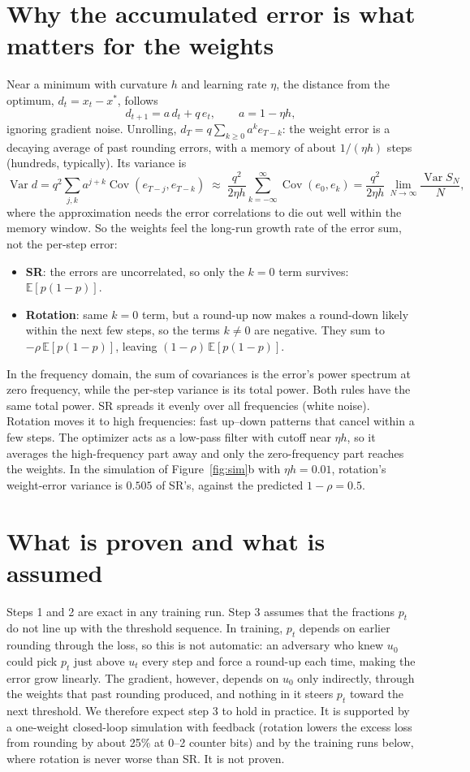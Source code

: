 \documentclass[11pt,letterpaper]{article}
\theoremstyle{definition}
\newcommand{\E}{\mathbb{E}}
\newcommand{\Var}{\operatorname{Var}}
\newcommand{\Cov}{\operatorname{Cov}}
\newcommand{\1}{\mathbf{1}}
\begin{document}
\section{Why the accumulated error is what matters for the weights}
Near a minimum with curvature $h$ and learning rate $\eta$, the distance from the optimum, $d_t=x_t-x^*$, follows
\[
d_{t+1}=a\,d_t+q\,e_t,\qquad a=1-\eta h,
\]
ignoring gradient noise. Unrolling, $d_T=q\sum_{k\ge0}a^k e_{T-k}$: the weight error is a decaying average of past
rounding errors, with a memory of about $1/(\eta h)$ steps (hundreds, typically). Its variance is
\[
\Var d=q^2\sum_{j,k}a^{j+k}\Cov(e_{T-j},e_{T-k})\;\approx\;\frac{q^2}{2\eta h}\sum_{k=-\infty}^{\infty}\Cov(e_0,e_k)
=\frac{q^2}{2\eta h}\,\lim_{N\to\infty}\frac{\Var S_N}{N},
\]
where the approximation needs the error correlations to die out well within the memory window. So the weights feel
the long-run growth rate of the error sum, not the per-step error:
\begin{itemize}\setlength{\itemsep}{0pt}
\item \textbf{SR}: the errors are uncorrelated, so only the $k=0$ term survives: $\E[p(1-p)]$.
\item \textbf{Rotation}: same $k=0$ term, but a round-up now makes a round-down likely within the next few steps, so
the terms $k\ne0$ are negative. They sum to $-\rho\,\E[p(1-p)]$, leaving $(1-\rho)\,\E[p(1-p)]$.
\end{itemize}
In the frequency domain, the sum of covariances is the error's power spectrum at zero frequency, while the per-step
variance is its total power. Both rules have the same total power. SR spreads it evenly over all frequencies (white
noise). Rotation moves it to high frequencies: fast up--down patterns that cancel within a few steps. The optimizer
acts as a low-pass filter with cutoff near $\eta h$, so it averages the high-frequency part away and only the
zero-frequency part reaches the weights. In the simulation of Figure~\ref{fig:sim}b with $\eta h=0.01$, rotation's
weight-error variance is $0.505$ of SR's, against the predicted $1-\rho=0.5$.

\section{What is proven and what is assumed}
Steps 1 and 2 are exact in any training run. Step 3 assumes that the fractions $p_t$ do not line up with the
threshold sequence. In training, $p_t$ depends on earlier rounding through the loss, so this is not automatic: an
adversary who knew $u_0$ could pick $p_t$ just above $u_t$ every step and force a round-up each time, making the error
grow linearly. The gradient, however, depends on $u_0$ only indirectly, through the weights that past rounding
produced, and nothing in it steers $p_t$ toward the next threshold. We therefore expect step 3 to hold in practice.
It is supported by a one-weight closed-loop simulation with feedback (rotation lowers the excess loss from rounding by
about 25\% at 0--2 counter bits) and by the training runs below, where rotation is never worse than SR. It is not proven.
\end{document}

